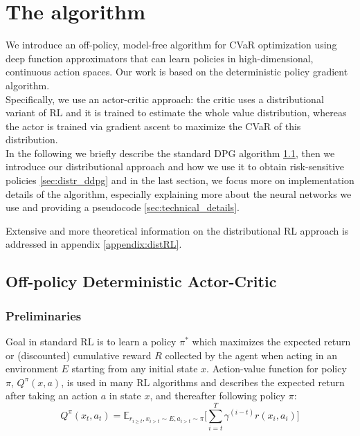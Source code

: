 \chapter{The algorithm }
\label{chapter:algo}

We introduce an off-policy, model-free algorithm for CVaR optimization using deep function approximators
that can learn policies in high-dimensional, continuous action spaces.
Our work is based on the deterministic policy gradient algorithm.\\
Specifically, we use an actor-critic approach: the critic uses a distributional variant
of RL and it is trained to estimate the whole value distribution, whereas the actor
is trained via gradient ascent to maximize the CVaR of this distribution.\\ 
In the following we briefly describe the standard DPG algorithm \ref{sec:DPG}, then we introduce
our distributional approach and how we use it to obtain risk-sensitive policies \ref{sec:distr_ddpg}
and in the last section, we focus more on implementation details of the algorithm, 
especially explaining more about the neural networks we use and providing a
pseudocode \ref{sec:technical_details}.

Extensive and more theoretical information on the distributional RL approach is addressed in 
appendix \ref{appendix:distRL}.

\section{Off-policy Deterministic Actor-Critic} \label{sec:DPG} 
\subsection{Preliminaries}

Goal in standard RL is to learn a policy $\pi^*$ which maximizes the expected return or (discounted) cumulative
reward $R$ collected by the agent when acting in an environment $E$ starting from any initial state $x$.
Action-value function for policy $\pi$, $Q^\pi(x,a)$, is used in many RL algorithms and describes the expected return after taking
an action $a$ in state $x$, and thereafter following policy $\pi$:
\begin{equation}
    Q^\pi(x_t,a_t) = \mathbb E_{r_{i\geq t},x_{i>t} \sim E, a_{i>t}\sim \pi}\Big[  \sum_{i=t}^T \gamma^{(i-t)}r(x_i,a_i) \Big]
\end{equation}

